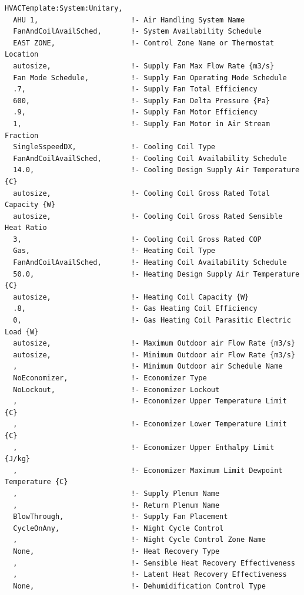 \begin{lstlisting}
HVACTemplate:System:Unitary,
  AHU 1,                      !- Air Handling System Name
  FanAndCoilAvailSched,       !- System Availability Schedule
  EAST ZONE,                  !- Control Zone Name or Thermostat Location
  autosize,                   !- Supply Fan Max Flow Rate {m3/s}
  Fan Mode Schedule,          !- Supply Fan Operating Mode Schedule
  .7,                         !- Supply Fan Total Efficiency
  600,                        !- Supply Fan Delta Pressure {Pa}
  .9,                         !- Supply Fan Motor Efficiency
  1,                          !- Supply Fan Motor in Air Stream Fraction
  SingleSspeedDX,             !- Cooling Coil Type
  FanAndCoilAvailSched,       !- Cooling Coil Availability Schedule
  14.0,                       !- Cooling Design Supply Air Temperature {C}
  autosize,                   !- Cooling Coil Gross Rated Total Capacity {W}
  autosize,                   !- Cooling Coil Gross Rated Sensible Heat Ratio
  3,                          !- Cooling Coil Gross Rated COP
  Gas,                        !- Heating Coil Type
  FanAndCoilAvailSched,       !- Heating Coil Availability Schedule
  50.0,                       !- Heating Design Supply Air Temperature {C}
  autosize,                   !- Heating Coil Capacity {W}
  .8,                         !- Gas Heating Coil Efficiency
  0,                          !- Gas Heating Coil Parasitic Electric Load {W}
  autosize,                   !- Maximum Outdoor air Flow Rate {m3/s}
  autosize,                   !- Minimum Outdoor air Flow Rate {m3/s}
  ,                           !- Minimum Outdoor air Schedule Name
  NoEconomizer,               !- Economizer Type
  NoLockout,                  !- Economizer Lockout
  ,                           !- Economizer Upper Temperature Limit {C}
  ,                           !- Economizer Lower Temperature Limit {C}
  ,                           !- Economizer Upper Enthalpy Limit {J/kg}
  ,                           !- Economizer Maximum Limit Dewpoint Temperature {C}
  ,                           !- Supply Plenum Name
  ,                           !- Return Plenum Name
  BlowThrough,                !- Supply Fan Placement
  CycleOnAny,                 !- Night Cycle Control
  ,                           !- Night Cycle Control Zone Name
  None,                       !- Heat Recovery Type
  ,                           !- Sensible Heat Recovery Effectiveness
  ,                           !- Latent Heat Recovery Effectiveness
  None,                       !- Dehumidification Control Type

\end{lstlisting}

